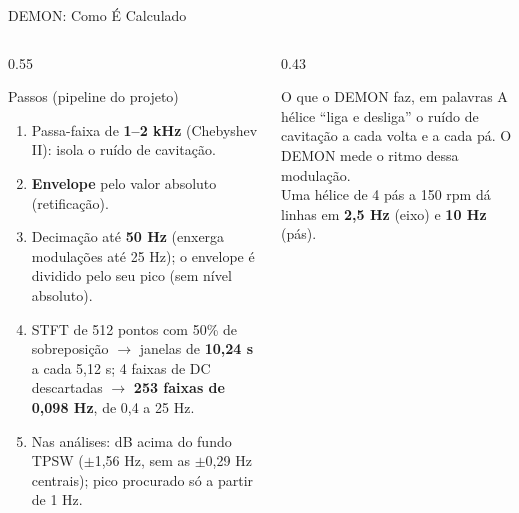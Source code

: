 \documentclass[aspectratio=169]{beamer}
\begin{document}
\begin{frame}{DEMON: Como É Calculado}
    \footnotesize
    \begin{columns}[T]
        \begin{column}{0.55\textwidth}
            \begin{block}{\small Passos (pipeline do projeto)}
                \scriptsize
                \begin{enumerate}
                    \setlength{\itemsep}{1pt}
                    \item Passa-faixa de \textbf{1--2 kHz} (Chebyshev II): isola o ruído de cavitação.
                    \item \textbf{Envelope} pelo valor absoluto (retificação).
                    \item Decimação até \textbf{50 Hz} (enxerga modulações até 25 Hz); o envelope é dividido pelo seu pico (sem nível absoluto).
                    \item STFT de 512 pontos com 50\% de sobreposição $\to$ janelas de \textbf{10,24 s} a cada 5,12 s; 4 faixas de DC descartadas $\to$ \textbf{253 faixas de 0,098 Hz}, de 0,4 a 25 Hz.
                    \item Nas análises: dB acima do fundo TPSW ($\pm$1,56 Hz, sem as $\pm$0,29 Hz centrais); pico procurado só a partir de 1 Hz.
                \end{enumerate}
            \end{block}
        \end{column}
        \begin{column}{0.43\textwidth}
            \begin{block}{\small O que o DEMON faz, em palavras}
                \scriptsize
                A hélice ``liga e desliga'' o ruído de cavitação a cada volta e a cada pá. O DEMON mede o ritmo dessa modulação.\\[3pt]
                Uma hélice de 4 pás a 150 rpm dá linhas em \textbf{2,5 Hz} (eixo) e \textbf{10 Hz} (pás).
            \end{block}
        \end{column}
    \end{columns}
\end{frame}
\end{document}

